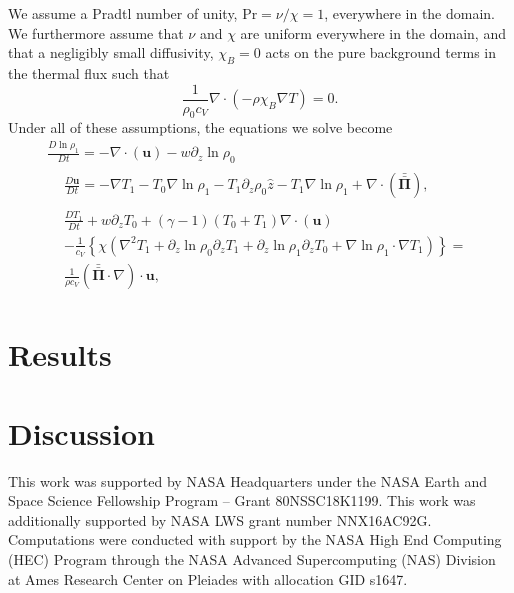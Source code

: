 \documentclass[twocolumn, amsmath, amsfonts, amssymb, trackchanges]{aastex62}
\newcommand{\Div}[1]{\ensuremath{\nabla\cdot\left( #1\right)}}
\newcommand{\grad}{\ensuremath{\nabla}}
\newcommand{\stressT}{\ensuremath{\bm{\bar{\bar{\Pi}}}}}
\begin{document}
We assume a Pradtl number of
unity, $\text{Pr} = \nu/\chi = 1$, everywhere in the domain. We furthermore assume
that $\nu$ and $\chi$ are uniform everywhere in the domain, and that a negligibly
small diffusivity, $\chi_B = 0$ acts on the pure background terms in the thermal flux
such that
$$
\frac{1}{\rho_0 c_V}\grad\cdot(-\rho \chi_B \grad T) = 0.
$$
Under all of these assumptions, the equations we solve become
\begin{gather}
\frac{D \ln\rho_1}{Dt} = -\Div{\bm{u}} - w\partial_z\ln\rho_0
	\label{eqn:solved_continuity}
\\
\begin{align}
&\frac{D \bm{u}}{D t} =
-\grad T_1 - T_0 \grad\ln\rho_1 - T_1\partial_z\rho_0\hat{z} - T_1\grad\ln\rho_1 + \Div{\stressT}, 
\end{align}
	\label{eqn:solved_momentum}
\\
\begin{align}
&\frac{D T_1}{D t} + w\partial_z T_0 +  (\gamma - 1)(T_0 + T_1)\Div{\bm{u}} 
\\&- \frac{1}{c_V}\left\{\chi\left(\grad^2 T_1 + \partial_z\ln\rho_0\partial_z T_1 
+ \partial_z\ln\rho_1\partial_z T_0 + \grad\ln\rho_1 \cdot\grad T_1\right)  \right\}=\nonumber\\
&\frac{1}{\rho c_V}(\stressT \cdot \grad)\cdot \bm{u}, \nonumber
\end{align}
	\label{eqn:solved_energy}
\end{gather}


\section{Results}
\label{sec:results}

\section{Discussion}
\label{sec:discussion}

\begin{acknowledgements}
This work was supported by NASA Headquarters under the NASA Earth and Space
Science Fellowship Program -- Grant 80NSSC18K1199.
This work was additionally supported by  NASA LWS grant number NNX16AC92G.  
Computations were conducted 
with support by the NASA High End Computing (HEC) Program through the NASA 
Advanced Supercomputing (NAS) Division at Ames Research Center on Pleiades
with allocation GID s1647.
\end{acknowledgements}
\end{document}
